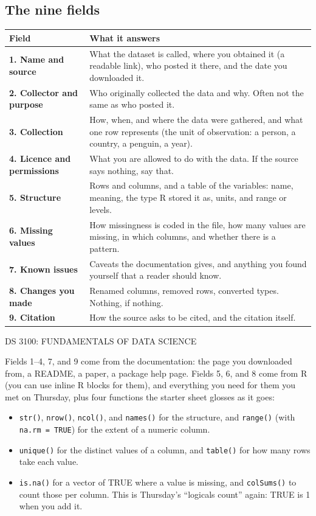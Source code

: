 \documentclass[11pt,letterpaper]{article}
\newcommand{\coursehead}{%
  {\sffamily\fontsize{7.5}{9}\selectfont\MakeUppercase{DS 3100: FUNDAMENTALS OF DATA SCIENCE}}%
}
\newcommand{\code}[1]{\texttt{#1}}
\begin{document}
\subsection*{The nine fields}
\renewcommand{\arraystretch}{1.15}
\begin{tabular}{>{\bfseries}p{} p{}}
\toprule
Field & What it answers\\
\midrule
1. Name and source & What the dataset is called, where you obtained it (a readable link), who posted it there, and the date you downloaded it.\\
2. Collector and purpose & Who originally collected the data and why. Often not the same as who posted it.\\
3. Collection & How, when, and where the data were gathered, and what one row represents (the unit of observation: a person, a country, a penguin, a year).\\
4. Licence and permissions & What you are allowed to do with the data. If the source says nothing, say that.\\
5. Structure & Rows and columns, and a table of the variables: name, meaning, the type R stored it as, units, and range or levels.\\
6. Missing values & How missingness is coded in the file, how many values are missing, in which columns, and whether there is a pattern.\\
7. Known issues & Caveats the documentation gives, and anything you found yourself that a reader should know.\\
8. Changes you made & Renamed columns, removed rows, converted types. Nothing, if nothing.\\
9. Citation & How the source asks to be cited, and the citation itself.\\
\bottomrule
\end{tabular}

\clearpage

\coursehead

Fields 1–4, 7, and 9 come from the documentation: the page you downloaded from, a README, a paper, a package help page. Fields 5, 6, and 8 come from R (you can use inline R blocks for them), and everything you need for them you met on Thursday, plus four functions the starter sheet glosses as it goes:

\begin{itemize}[leftmargin=17pt,itemsep=2pt]
  \item \code{str()}, \code{nrow()}, \code{ncol()}, and \code{names()} for the structure, and \code{range()} (with \code{na.rm = TRUE}) for the extent of a numeric column.
  \item \code{unique()} for the distinct values of a column, and \code{table()} for how many rows take each value.
  \item \code{is.na()} for a vector of TRUE where a value is missing, and \code{colSums()} to count those per column. This is Thursday's “logicals count” again: TRUE is 1 when you add it.
\end{itemize}
\end{document}
